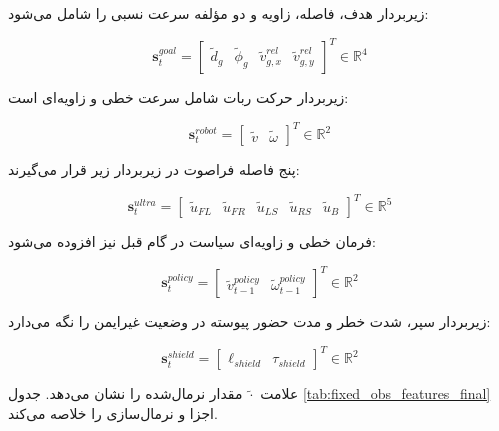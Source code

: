 زیر‌بردار هدف، فاصله، زاویه و دو مؤلفه سرعت نسبی را شامل می‌شود:

\begin{equation}
	\mathbf{s}^{goal}_t =
	\begin{bmatrix}
		\tilde{d}_g &
		\tilde{\phi}_g &
		\tilde{v}^{rel}_{g,x} &
		\tilde{v}^{rel}_{g,y}
	\end{bmatrix}^{T}
	\in \mathbb{R}^{4}
	\label{eq:goal_fixed_features}
\end{equation}

زیر‌بردار حرکت ربات شامل سرعت خطی و زاویه‌ای است:

\begin{equation}
	\mathbf{s}^{robot}_t =
	\begin{bmatrix}
		\tilde{v} &
		\tilde{\omega}
	\end{bmatrix}^{T}
	\in \mathbb{R}^{2}
	\label{eq:robot_fixed_features}
\end{equation}

پنج فاصله فراصوت در زیر‌بردار زیر قرار می‌گیرند:

\begin{equation}
	\mathbf{s}^{ultra}_t =
	\begin{bmatrix}
		\tilde{u}_{FL} &
		\tilde{u}_{FR} &
		\tilde{u}_{LS} &
		\tilde{u}_{RS} &
		\tilde{u}_{B}
	\end{bmatrix}^{T}
	\in \mathbb{R}^{5}
	\label{eq:ultrasonic_fixed_features}
\end{equation}

فرمان خطی و زاویه‌ای سیاست در گام قبل نیز افزوده می‌شود:

\begin{equation}
	\mathbf{s}^{policy}_t =
	\begin{bmatrix}
		\tilde{v}^{policy}_{t-1} &
		\tilde{\omega}^{policy}_{t-1}
	\end{bmatrix}^{T}
	\in \mathbb{R}^{2}
	\label{eq:policy_fixed_features}
\end{equation}

زیر‌بردار سپر، شدت خطر و مدت حضور پیوسته در وضعیت غیرایمن را نگه می‌دارد:

\begin{equation}
	\mathbf{s}^{shield}_t =
	\begin{bmatrix}
		\ell_{shield} &
		\tau_{shield}
	\end{bmatrix}^{T}
	\in \mathbb{R}^{2}
	\label{eq:shield_fixed_features}
\end{equation}

علامت \(\tilde{\cdot}\) مقدار نرمال‌شده را نشان می‌دهد. جدول \ref{tab:fixed_obs_features_final} اجزا و نرمال‌سازی را خلاصه می‌کند.

